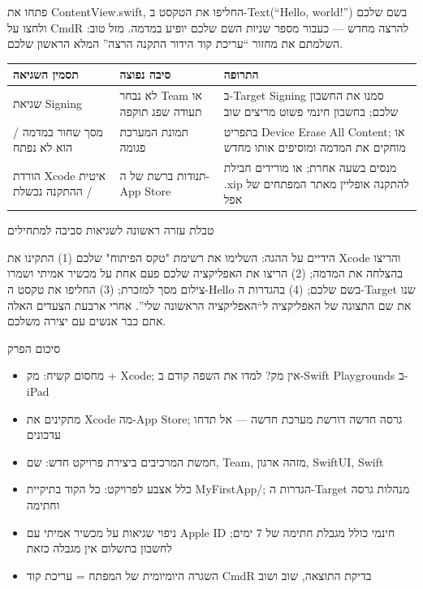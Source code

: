 

פתחו את ContentView.swift, החליפו את הטקסט ב-Text(“Hello, world!”) בשם שלכם ולחצו על CmdR להרצה מחדש — כעבור מספר שניות השם שלכם יופיע במדמה. מזל טוב: השלמתם את מחזור “עריכת קוד הידור התקנה הרצה” המלא הראשון שלכם.

\begin{center}
\begin{tabularx}{\linewidth}{|X|X|X|}
\hline
\textbf{תסמין השגיאה} & \textbf{סיבה נפוצה} & \textbf{התרופה} \tabularnewline
\hline
שגיאת Signing & לא נבחר Team או תעודה שפג תוקפה & ב-Target Signing סמנו את החשבון שלכם; בחשבון חינמי פשוט מריצים שוב \tabularnewline
מסך שחור במדמה / הוא לא נפתח & תמונת המערכת פגומה & בתפריט Device Erase All Content; או מוחקים את המדמה ומוסיפים אותו מחדש \tabularnewline
הורדת Xcode איטית / ההתקנה נכשלת & תנודות ברשת של ה-App Store & מנסים בשעה אחרת; או מורידים חבילת .xip להתקנה אופליין מאתר המפתחים של אפל \tabularnewline
\hline
\end{tabularx}
\end{center}

\begin{center}\small\color{gray}טבלת עזרה ראשונה לשגיאות סביבה למתחילים\end{center}

\begin{tcbpractice}{הידיים על ההגה: השלימו את רשימת "טקס הפיתוח" שלכם}
(1) התקינו את Xcode והריצו בהצלחה את המדמה; (2) הריצו את האפליקציה שלכם פעם אחת על מכשיר אמיתי ושמרו צילום מסך למזכרת; (3) החליפו את טקסט ה-Hello בשם שלכם; (4) בהגדרות ה-Target שנו את שם התצוגה של האפליקציה ל“האפליקציה הראשונה שלי”. אחרי ארבעת הצעדים האלה אתם כבר אנשים עם יצירה משלכם.

\end{tcbpractice}

\begin{tcbsummary}{סיכום הפרק}
\begin{itemize}
  \item מחסום קשיח: מק + Xcode; אין מק? למדו את השפה קודם ב-Swift Playgrounds ב-iPad
  \item מתקינים את Xcode מה-App Store; גרסה חדשה דורשת מערכת חדשה — אל תדחו עדכונים
  \item חמשת המרכיבים ביצירת פרויקט חדש: שם, Team, מזהה ארגון, SwiftUI, Swift
  \item כלל אצבע לפרויקט: כל הקוד בתיקיית MyFirstApp/; הגדרות ה-Target מנהלות גרסה וחתימה
  \item ניפוי שגיאות על מכשיר אמיתי עם Apple ID חינמי כולל מגבלת חתימה של 7 ימים; לחשבון בתשלום אין מגבלה כזאת
  \item השגרה היומיומית של המפתח = עריכת קוד CmdR בדיקת התוצאה, שוב ושוב
\end{itemize}

\end{tcbsummary}
